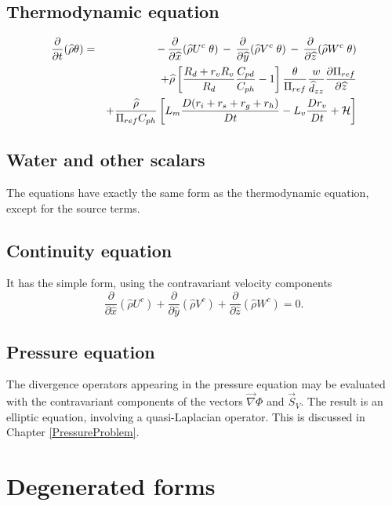 \subsection{Thermodynamic equation}

\begin{eqnarray}
\dfrac{\partial}{\partial t}(\widehat{\rho} \theta) &=& \, - \,
 \dfrac{\partial }{\partial \widehat{x}} (\widehat{\rho} U^{c } \;   \theta)
 \, - \, \dfrac{\partial }{\partial \widehat{y}} (\widehat{\rho} V^{c }  \;  \theta )
 \, - \, \dfrac{\partial }{\partial \widehat{z}} (\widehat{\rho} W^{c }  \;
 \theta) \nonumber \\ & &
+\widehat{\rho} \left[ {R_d+r_vR_v\over R_d}{C_{pd} \over C_{ph}}-1 \right]
{\theta \over \Pi_{ref}} {w \over \widehat{d}_{zz} }
 {\partial \Pi_{ref} \over \partial \widehat{z}}
\nonumber \\ & &
+ {\widehat{\rho}\over \Pi_{ref} C_{ph}} \left[
 L_m {D(r_i+r_s+r_g+r_h)\over Dt} - L_v {Dr_v\over Dt} + {\cal H}  \right]
\end{eqnarray}

\subsection{Water and other scalars}
The equations have exactly the same form as the thermodynamic equation,
except for the source terms.

\subsection{Continuity equation}
It has the simple form, using the contravariant velocity components
\begin{equation}
\dfrac{\partial }{\partial \widehat{x}} (\widehat{\rho} U^{c })
+ \dfrac{\partial }{\partial \widehat{y}} (\widehat{\rho} V^{c })
+ \dfrac{\partial }{\partial \widehat{z}} (\widehat{\rho} W^{c }) =0.
\end{equation}

\subsection{Pressure equation}
The divergence operators appearing in the pressure equation may be
evaluated with the contravariant components of the vectors $\vec{\nabla}\Phi$
and $\vec{S}_V$. The result is an elliptic equation, involving a
quasi-Laplacian operator. This is discussed in Chapter \ref{PressureProblem}.

\section{Degenerated forms}


